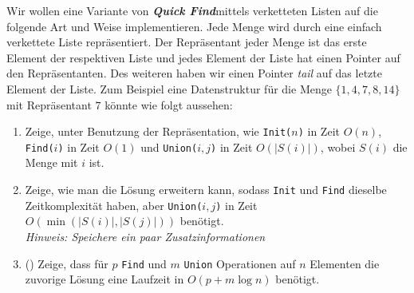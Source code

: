 \documentclass{uebung_cs}
\newcommand{\qfind}{\textit{\textbf{Quick Find}}}
\begin{document}
\begin{aufgabe}
	Wir wollen eine Variante von \qfind mittels verketteten Listen auf die folgende Art und Weise implementieren.
	Jede Menge wird durch eine einfach verkettete Liste repräsentiert.
	Der Repräsentant jeder Menge ist das erste Element der respektiven Liste und jedes Element der Liste hat einen Pointer auf den Repräsentanten.
	Des weiteren haben wir einen Pointer \textit{tail} auf das letzte Element der Liste.
	Zum Beispiel eine Datenstruktur für die Menge $\{1,4,7,8,14\}$ mit Repräsentant $7$ könnte wie folgt aussehen:
	\begin{enumerate}
		\item Zeige, unter Benutzung der Repräsentation, wie \texttt{Init($n$)} in Zeit $O(n)$, \texttt{Find($i$)} in Zeit $O(1)$ und \texttt{Union($i,j$)} in Zeit $O(|S(i)|)$, wobei $S(i)$ die Menge mit $i$ ist.
		\item Zeige, wie man die Lösung erweitern kann, sodass \texttt{Init} und \texttt{Find} dieselbe Zeitkomplexität haben, aber \texttt{Union($i,j$)} in Zeit $O(\min(|S(i)|, |S(j)|))$ benötigt.\\
		\textit{Hinweis: Speichere ein paar Zusatzinformationen}
		\item (\hard) Zeige, dass für $p$ \texttt{Find} und $m$ \texttt{Union} Operationen auf $n$ Elementen die zuvorige Lösung eine Laufzeit in $O(p + m\log n)$ benötigt.
	\end{enumerate}
\end{aufgabe}
\end{document}
